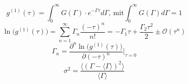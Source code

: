 \documentclass[
	a4paper,										%
	12pt,											%
	twoside,										%
	headsepline,								%
	footsepline,									%
	captions=tableheading,					%
]{scrartcl}
\newcommand{\formel}[2]{				%
	\begin{equation}
		\label{eq: #1}							%
		#2											%
	\end{equation}}
\begin{document}
\formel{}{g^{(1)}(\tau) = \int_{0}^{\infty} G(\Gamma) \cdot e^{-\Gamma \tau} d\Gamma , \ \text{mit} \int_{0}^{\infty} G(\Gamma) d\Gamma = 1}
\formel{}{\ln{\bigg(g^{(1)}(\tau)\bigg)} = \sum_{n = 1}^{\infty} \Gamma_n \frac{(-\tau)^n}{n!} = -\Gamma_1 \tau + \frac{\Gamma_2 \tau^2}{2} \pm \mathcal{O}(\tau^n)}
\formel{}{\Gamma_n = \frac{\partial^n \ln{\big(g^{(1)}(\tau)\big)}}{\partial (-\tau)^n} \Bigg|_{\tau = 0}}
\formel{}{\sigma^2 = \frac{\langle (\Gamma - \langle \Gamma \rangle )^2 \rangle}{\langle \Gamma \rangle}}
\end{document}
